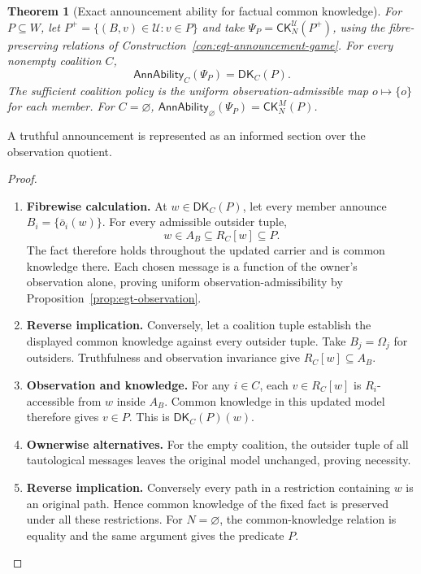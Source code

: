 \documentclass[11pt,a4paper]{article}
\numberwithin{equation}{section}
\newtheorem{theorem}{Theorem}[section]
\theoremstyle{definition}
\theoremstyle{remark}
\theoremstyle{plain}
\begin{document}
\begin{theorem}[Exact announcement ability for factual common knowledge]
\label{thm:egt-coalition-announcement}
For $P\subseteq W$, let $P^+=\{(B,v)\in\mathcal U:v\in P\}$
and take $\Psi_P=\mathsf{CK}_N^{\mathcal U}(P^+)$, using the
fibre-preserving relations of Construction~\ref{con:egt-announcement-game}.
For every nonempty coalition $C$,
\begin{equation}\label{eq:egt-announcement-distributed-knowledge}
 \mathsf{AnnAbility}_C(\Psi_P)=\mathsf{DK}_C(P).
\end{equation}
The sufficient coalition policy is the uniform observation-admissible
map $o\mapsto\{o\}$ for each member. For $C=\varnothing$,
$\mathsf{AnnAbility}_{\varnothing}(\Psi_P)=\mathsf{CK}_N^M(P)$.
\end{theorem}

\noindent A truthful announcement is represented as an informed section over the observation quotient.
\begin{center}
\end{center}


\begin{proof}
\leavevmode
\begin{enumerate}[label=\textup{(\arabic*)},leftmargin=*,itemsep=4pt,topsep=3pt]
  \item \textbf{Fibrewise calculation.} At $w\in\mathsf{DK}_C(P)$, let every member announce
$B_i=\{\bar o_i(w)\}$. For every admissible outsider tuple,
\[
 w\in A_B\subseteq R_C[w]\subseteq P.
\]
The fact therefore holds throughout the updated carrier and is common
knowledge there. Each chosen message is a function of the owner's
observation alone, proving uniform observation-admissibility by
Proposition~\ref{prop:egt-observation}.
  \item \textbf{Reverse implication.} Conversely, let a coalition tuple establish the displayed common knowledge
against every outsider tuple. Take $B_j=\Omega_j$ for outsiders. Truthfulness and observation invariance give $R_C[w]\subseteq A_B$.
  \item \textbf{Observation and knowledge.} For any $i\in C$, each $v\in R_C[w]$ is $R_i$-accessible from $w$
inside $A_B$. Common knowledge in this updated model therefore gives
$v\in P$. This is $\mathsf{DK}_C(P)(w)$.
  \item \textbf{Ownerwise alternatives.} For the empty coalition, the outsider tuple of all tautological messages
leaves the original model unchanged, proving necessity.
  \item \textbf{Reverse implication.} Conversely every
path in a restriction containing $w$ is an original path. Hence common
knowledge of the fixed fact is preserved under all these restrictions. For $N=\varnothing$, the common-knowledge relation is equality and the
same argument gives the predicate $P$.
\end{enumerate}
\end{proof}
\end{document}
